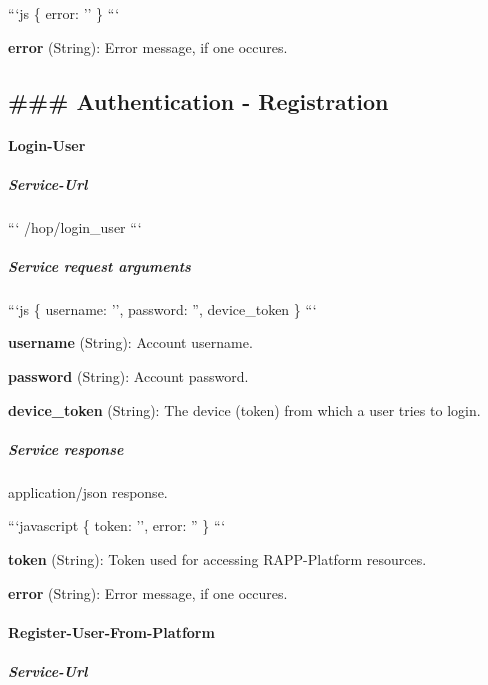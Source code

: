 ```js \{ error\-: '' \} ```


\begin{DoxyItemize}
\item {\bfseries error} (String)\-: Error message, if one occures.
\end{DoxyItemize}



 \subsection*{\#\#\# Authentication -\/ Registration }

\paragraph*{Login-\/\-User}

\subparagraph*{Service-\/\-Url}

``` /hop/login\-\_\-user ```

\subparagraph*{Service request arguments}

```js \{ username\-: '', password\-: '', device\-\_\-token \} ```


\begin{DoxyItemize}
\item {\bfseries username} (String)\-: Account username.
\item {\bfseries password} (String)\-: Account password.
\item {\bfseries device\-\_\-token} (String)\-: The device (token) from which a user tries to login.
\end{DoxyItemize}

\subparagraph*{Service response}

application/json response.

```javascript \{ token\-: '', error\-: '' \} ```


\begin{DoxyItemize}
\item {\bfseries token} (String)\-: Token used for accessing R\-A\-P\-P-\/\-Platform resources.
\item {\bfseries error} (String)\-: Error message, if one occures.
\end{DoxyItemize}

\paragraph*{Register-\/\-User-\/\-From-\/\-Platform}

\subparagraph*{Service-\/\-Url}

